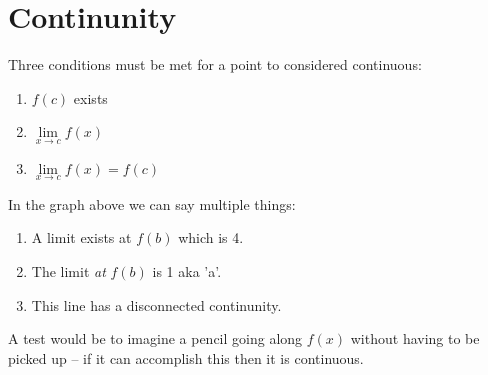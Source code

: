 \section{Continunity}
Three conditions must be met for a point to considered continuous:\\
\begin{enumerate}
	
\item$ f(c)$ exists\\
\item$\lim\limits_{x \to c} f(x)$\\
\item$\lim\limits_{x \to c} f(x) = f(c)$

\end{enumerate}
\newpage
\begin{center}
\end{center}

In the graph above we can say multiple things:
\begin{enumerate}
\item A limit exists at $f(b)$ which is 4.\\
\item The limit \textit{at} $f(b)$ is 1 aka 'a'.\\
\item This line has a disconnected continunity. \\
\end{enumerate}

A test would be to imagine a pencil going along $f(x)$ without having to be picked up -- if it can accomplish this then it is continuous.


